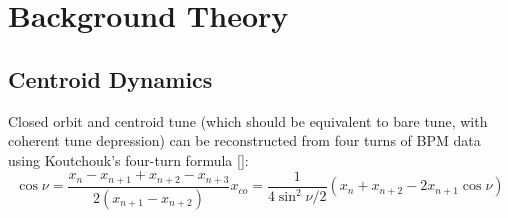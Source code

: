 
\renewcommand{\thechapter}{2}

\chapter{Background Theory}

\section{Centroid Dynamics}




Closed orbit and centroid tune (which should be equivalent to bare tune, with coherent tune depression) can be reconstructed from four turns of BPM data using Koutchouk's four-turn formula [\cite{Koutchouk}]:
\begin{subequations}
\begin{equation}
\label{}
\cos \nu = \frac{x_n - x_{n+1} + x_{n+2} - x_{n+3}}{2(x_{n+1}-x_{n+2})}
\end{equation}
\begin{equation}
\label{}
x_{co} = \frac{1}{4\sin ^2 \nu/2}(x_n+x_{n+2}-2x_{n+1}\cos \nu)
\end{equation}
\end{subequations}

